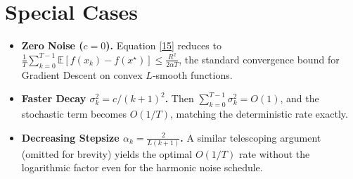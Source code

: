 \documentclass[11pt]{article}
\begin{document}
\section*{Special Cases}
\begin{itemize}
\item \textbf{Zero Noise ($c=0$).} Equation \eqref{15} reduces to
$\frac{1}{T}\sum_{k=0}^{T-1}\mathbb{E}[f(x_k)-f(x^{\star})]\le \frac{R^{2}}{2\alpha T}$,
the standard convergence bound for Gradient Descent on convex $L$‑smooth functions.

\item \textbf{Faster Decay $\sigma_k^{2}=c/(k+1)^{2}$.}
Then $\sum_{k=0}^{T-1}\sigma_k^{2}=O(1)$, and the stochastic term becomes $O(1/T)$,
matching the deterministic rate exactly.

\item \textbf{Decreasing Stepsize $\alpha_k = \frac{2}{L(k+1)}$.}
A similar telescoping argument (omitted for brevity) yields the optimal $O(1/T)$
rate without the logarithmic factor even for the harmonic noise schedule.
\end{itemize}
\end{document}
